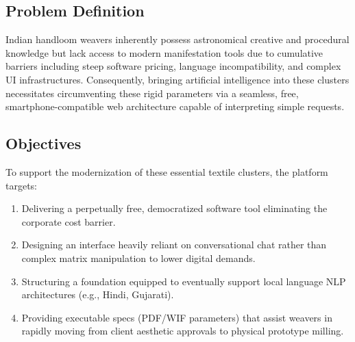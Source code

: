 \subsection{Problem Definition}
Indian handloom weavers inherently possess astronomical creative and procedural knowledge but lack access to modern manifestation tools due to cumulative barriers including steep software pricing, language incompatibility, and complex UI infrastructures. Consequently, bringing artificial intelligence into these clusters necessitates circumventing these rigid parameters via a seamless, free, smartphone-compatible web architecture capable of interpreting simple requests.

\subsection{Objectives}
To support the modernization of these essential textile clusters, the platform targets:
\begin{enumerate}
    \item Delivering a perpetually free, democratized software tool eliminating the corporate cost barrier.
    \item Designing an interface heavily reliant on conversational chat rather than complex matrix manipulation to lower digital demands.
    \item Structuring a foundation equipped to eventually support local language NLP architectures (e.g., Hindi, Gujarati).
    \item Providing executable specs (PDF/WIF parameters) that assist weavers in rapidly moving from client aesthetic approvals to physical prototype milling.
\end{enumerate}
